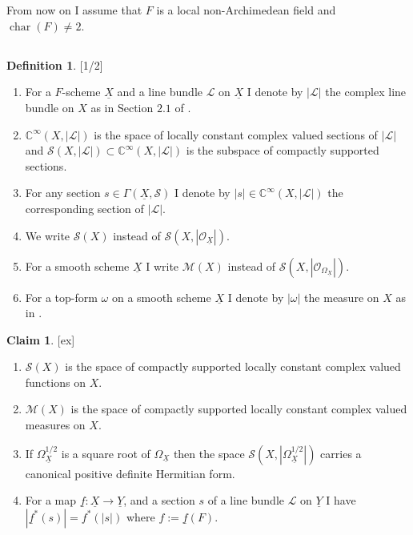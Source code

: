 \documentclass[11pt,a4paper,twoside]{amsart}
\theoremstyle{definition}
\newtheorem{definition}[theorem]{Definition}
\newtheorem{claim}[theorem]{Claim}
\newcommand{\mC}{\mathbb C}
\newcommand{\mcL}{\mathcal L}
\newcommand{\mcM}{\mathcal M}
\newcommand{\mcO}{\mathcal O}
\newcommand{\mcS}{\mathcal S}
\newcommand{\GG}{\Gamma}
\newcommand{\bO}{\Omega}
\newcommand{\bo}{\omega}
\newcommand{\un}{\underline}
\begin{document}
 \section{} From now on I assume that $F$ is a local non-Archimedean field and $\operatorname{char}(F) \neq 2$.
 \subsection{} 


\begin{definition}\label{1/2}[1/2]
\begin{enumerate} 
\item For  a  $F$-scheme $\un X$ and a line bundle $\mcL$ on $\un X$ 
I denote by $ |\mcL| $ the complex line bundle on $X$ as in Section $2.1$ of \cite{BK}.
\item  $ \mC ^\infty (X, |\mcL|) $ is the space of locally constant complex valued sections of $ |\mcL|$ and 
$\mcS (X, |\mcL|)\subset  \mC ^\infty (X, |\mcL|) $ is the subspace of  compactly supported sections.
\item For any section $s\in \GG (\un X, \mcS)$ I denote  by $|s|\in  \mC ^\infty (X,|\mcL|) $ the corresponding section of  $ |\mcL| $. 
\item We write $ \mcS (X) $ instead of $ \mcS (X, |\mcO _{\un X}|) $.
\item For a smooth scheme $\un  X$ I write  $\mcM (X)$ instead 
of $  \mcS (X, |\mcO _{\bO _{\un X}} |)$.

\item For a top-form $\bo $ on a smooth scheme 
$\un X$ I denote by $|\bo|$ the measure on $X$ as  in \cite{W}.


\end{enumerate}
\end{definition}
\begin{claim}\label{ex}[ex] \begin{enumerate} 
\item $ \mcS (X) $ is the space of compactly supported locally constant complex valued functions on $X$.
\item $\mcM (X)$ is the space of compactly supported locally constant complex valued measures on $X$.
\item If  $ \bO ^{1/2}_{\un X} $ is  a square root of $\bO _{\un X}$ then the 
space $\mcS (X, | \bO ^{1/2} _{\un X }|)$ carries  a canonical positive definite Hermitian form.
\item For a  map $\un f: \un X \to \un Y$, and a section $s$ of a  line bundle $\mcL$ on $\un Y$ I have $|\un f ^\ast (s)|= f^\ast (|s|)$ where $f:= \un f(F)$.
\end{enumerate}
\end{claim}
\end{document}
